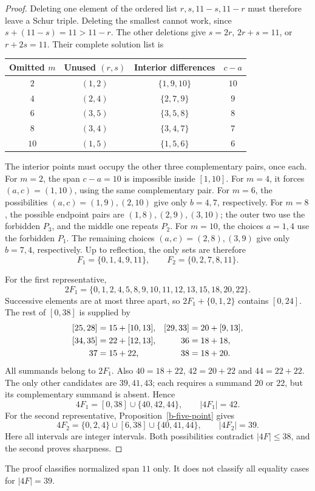 \begin{proof}
Deleting one element of the ordered list $r,s,11-s,11-r$ must therefore
leave a Schur triple. Deleting the smallest cannot work, since
$s+(11-s)=11>11-r$. The other deletions give $s=2r$, $2r+s=11$, or
$r+2s=11$. Their complete solution list is
\begin{center}
\begin{tabular}{cccc}
\toprule
Omitted $m$ & Unused $(r,s)$ & Interior differences & $c-a$\\
\midrule
$2$  & $(1,2)$ & $\{1,9,10\}$ & $10$\\
$4$  & $(2,4)$ & $\{2,7,9\}$  & $9$\\
$6$  & $(3,5)$ & $\{3,5,8\}$  & $8$\\
$8$  & $(3,4)$ & $\{3,4,7\}$  & $7$\\
$10$ & $(1,5)$ & $\{1,5,6\}$  & $6$\\
\bottomrule
\end{tabular}
\end{center}
The interior points must occupy the other three complementary pairs,
once each. For $m=2$, the span $c-a=10$ is impossible inside $[1,10]$.
For $m=4$, it forces $(a,c)=(1,10)$, using the same complementary pair.
For $m=6$, the possibilities $(a,c)=(1,9),(2,10)$ give only
$b=4,7$, respectively. For $m=8$, the possible endpoint pairs are
$(1,8),(2,9),(3,10)$; the outer two use the forbidden $P_3$, and the
middle one repeats $P_2$. For $m=10$, the choices $a=1,4$ use the
forbidden $P_1$. The remaining choices $(a,c)=(2,8),(3,9)$ give only
$b=7,4$, respectively. Up to reflection, the only sets are therefore
\[
 F_1=\{0,1,4,9,11\},\qquad F_2=\{0,2,7,8,11\}.
\]

For the first representative,
\[
 2F_1=\{0,1,2,4,5,8,9,10,11,12,13,15,18,20,22\}.
\]
Successive elements are at most three apart, so
$2F_1+\{0,1,2\}$ contains $[0,24]$. The rest of $[0,38]$ is supplied by
\[
\begin{aligned}
\relax[25,28]&=15+[10,13],& [29,33]&=20+[9,13],\\
 [34,35]&=22+[12,13],& 36&=18+18,\\
 37&=15+22,&38&=18+20.
\end{aligned}
\]
All summands belong to $2F_1$. Also $40=18+22$, $42=20+22$ and
$44=22+22$. The only other candidates are $39,41,43$; each requires a
summand $20$ or $22$, but its complementary summand is absent. Hence
\[
 4F_1=[0,38]\cup\{40,42,44\},\qquad |4F_1|=42.
\]
For the second representative, Proposition~\ref{b-five-point} gives
\[
 4F_2=\{0,2,4\}\cup[6,38]\cup\{40,41,44\},\qquad |4F_2|=39.
\]
Here all intervals are integer intervals. Both possibilities contradict
$|4F|\le38$, and the second proves sharpness.
\end{proof}

The proof classifies normalized span $11$ only. It does not classify all
equality cases for $|4F|=39$.
